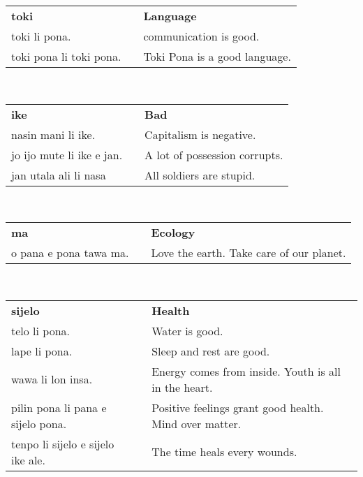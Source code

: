 %
\begin{supertabular}{p{6cm}|ll}
\textbf{toki} && \textbf{Language} \\
toki li pona.  && communication is good.  \\
toki pona li toki pona.  && Toki Pona is a good language.  \\
\end{supertabular} \\
%
\begin{supertabular}{p{6cm}|ll}
\textbf{ike} && \textbf{Bad} \\
nasin mani li ike.  && Capitalism is negative.  \\
jo ijo mute li ike e jan.  && A lot of possession corrupts.  \\
jan utala ali li nasa && All soldiers are stupid. \\
\end{supertabular} \\
%
\begin{supertabular}{p{6cm}|ll}
\textbf{ma} && \textbf{Ecology} \\
o pana e pona tawa ma.  && Love the earth. Take care of our planet.  \\ 
\end{supertabular} \\
%
\begin{supertabular}{p{6cm}|ll}
\textbf{sijelo} && \textbf{Health} \\
telo li pona.  && Water is good.  \\
lape li pona.  && Sleep and rest are good.  \\
wawa li lon insa.  && Energy comes from inside. Youth is all in the heart. \\ 
pilin pona li pana e sijelo pona. && Positive feelings grant good health. Mind over matter.  \\ 
tenpo li sijelo e sijelo ike ale. && The time heals every wounds. \\
\end{supertabular} \\
%
%
